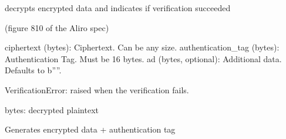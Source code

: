 \documentclass[letterpaper,10pt,english]{sphinxmanual}
\begin{document}
\begin{fulllineitems}
\begin{fulllineitems}
\end{fulllineitems}


\begin{fulllineitems}
\label{\detokenize{aliro_actuator.access_protocol.encryption:aliro_actuator.access_protocol.encryption.EncryptionEngine.decrypt}}
\pysigstartsignatures
{}
\pysigstopsignatures
\sphinxAtStartPar
decrypts encrypted data and indicates if verification succeeded

\sphinxAtStartPar
(figure 8\sphinxhyphen{}10 of the Aliro spec)
\begin{description}
\sphinxAtStartPar
ciphertext (bytes): Ciphertext. Can be any size.
authentication\_tag (bytes): Authentication Tag. Must be 16 bytes.
ad (bytes, optional): Additional data. Defaults to b””.

\sphinxAtStartPar
VerificationError: raised when the verification fails.

\sphinxAtStartPar
bytes: decrypted plaintext

\end{description}

\end{fulllineitems}


\begin{fulllineitems}
\label{\detokenize{aliro_actuator.access_protocol.encryption:aliro_actuator.access_protocol.encryption.EncryptionEngine.encrypt}}
\pysigstartsignatures
{}
\pysigstopsignatures
\sphinxAtStartPar
Generates encrypted data + authentication tag


\end{fulllineitems}
\end{fulllineitems}
\end{document}
